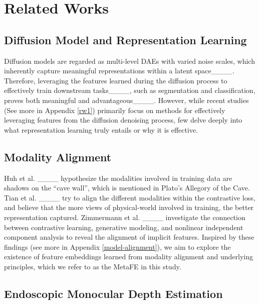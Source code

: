 \section{Related Works}
\subsection{Diffusion Model and Representation Learning}
Diffusion models are regarded as multi-level DAEs with varied noise scales, which inherently capture meaningful representations within a latent space____. Therefore, leveraging the features learned during the diffusion process to effectively train downstream tasks____, such as segmentation and classification, proves both meaningful and advantageous____. However, while recent studies (See more in Appendix \ref{rw1}) primarily focus on methods for effectively leveraging features from the diffusion denoising process, few delve deeply into what representation learning truly entails or why it is effective.\par   

\subsection{Modality Alignment}
Huh et al. ____ hypothesize the modalities involved in training data are shadows on the \enquote{cave wall}, which is mentioned in Plato’s Allegory of the Cave. Tian et al. ____ try to align the different modalities within the contrastive loss, and believe that the more views of physical-world involved in training, the better representation captured. Zimmermann et al. ____ investigate the connection between contrastive learning, generative modeling, and nonlinear independent component analysis to reveal the alignment of implicit features. Inspired by these findings (see more in Appendix \ref{model-alignment}), we aim to explore the existence of feature embeddings learned from modality alignment and underlying principles, which we refer to as the MetaFE in this study.\par 

\subsection{Endoscopic Monocular Depth Estimation}

